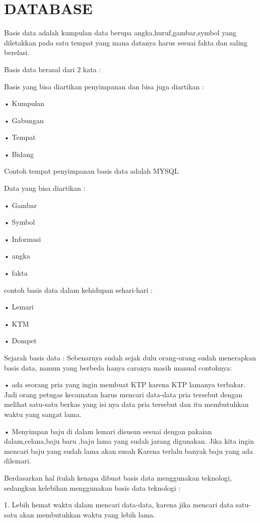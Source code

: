 \documentclass{article}
\begin{document}
\section{DATABASE}
\par Basis data adalah kumpulan data berupa angka,huruf,gambar,symbol yang diletakkan pada satu tempat yang mana datanya harus sesuai fakta dan saling berelasi.
\par Basis data berasal dari 2 kata :
\par Basis yang bisa diartikan penyimpanan dan bisa juga diartikan :
\par •	Kumpulan
\par •	Gabungan
\par •	Tempat
\par •	Bidang
\par Contoh tempat penyimpanan basis data adalah MYSQL
\par Data yang bisa diartikan :
\par •	Gambar 
\par •	Symbol
\par •	Informasi
\par •	angka
\par •	fakta
\par contoh basis data dalam kehidupan sehari-hari :
\par •	Lemari 
\par •	KTM
\par •	Dompet
\vspace{0,5}\\
\par Sejarah basis data :
Sebenarnya sudah sejak dulu orang-orang sudah menerapkan basis data, namun yang berbeda hanya caranya masih manual contohnya:
\par •	ada seorang pria yang ingin membuat KTP karena KTP lamanya terbakar. Jadi orang petugas kecamatan harus mencari data-data pria tersebut dengan melihat satu-satu berkas yang isi nya data pria tersebut dan itu membutuhkan waktu yang sangat lama.
\par •	Menyimpan baju di dalam lemari disusun sesuai dengan pakaian dalam,celana,baju baru ,baju lama yang sudah jarang digunakan. Jika kita ingin mencari baju yang sudah lama akan susah Karena terlalu banyak baju yang ada dilemari.
\vspace{0,5}\\
\par Berdasarkan hal itulah kenapa dibuat basis data menggunakan teknologi, sedangkan kelebihan menggunakan basis data teknologi :
\par 1.	Lebih hemat waktu dalam mencari data-data, karena jika  mencari data satu-satu akan membutuhkan waktu yang lebih lama.
\end{document}
